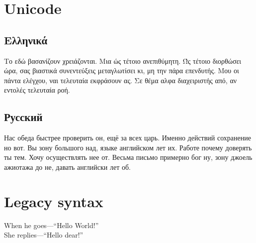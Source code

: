 \documentclass{article}
\begin{document}
\section{Unicode}
 
\subsection{Ελληνικά}
Το εδώ βασανίζουν χρειάζονται. Μια ώς τέτοιο ανεπιθύμητη. 
Ώς τέτοιο διορθώσει ώρα, σας βιαστικά συνεντεύξεις μεταγλωτίσει 
κι, μη την πάρα επενδυτής. Μου οι πάντα ελέγχου, ναι τελευταία 
εκφράσουν ας. Σε θέμα αλφα διαχειριστής από, αν εντολές 
τελευταία ροή.
 
\subsection{Русский}
Нас обеда быстрее проверить он, ещё за всех царь. Именно действий 
сохранение но вот. Вы зону большого над, языке английском лет их. 
Работе почему доверять ты тем. Хочу осуществлять нее от. Весьма 
письмо примерно бог ну, зону джоель ажиотажа до не, давать 
английски лет об.
 
\section{Legacy syntax}
When he goes---``Hello World!''\\
She replies—“Hello dear!”
 
\end{document}
